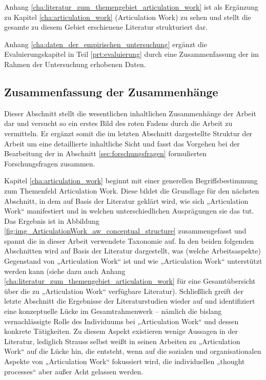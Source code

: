 Anhang \ref{cha:literatur_zum_themengebiet_articulation_work} ist als Ergänzung zu Kapitel \ref{cha:articulation_work} (Articulation Work) zu sehen und stellt die gesamte zu diesem Gebiet erschienene Literatur strukturiert dar.

Anhang \ref{cha:daten_der_empirischen_untersuchung} ergänzt die Evaluierungskapitel in Teil \ref{prt:evaluierung} durch eine Zusammenfassung der im Rahmen der Untersuchung erhobenen Daten.

\subsection{Zusammenfassung der Zusammenhänge} %
\label{sub:zusammenhänge}

Dieser Abschnitt stellt die wesentlichen inhaltlichen Zusammenhänge der Arbeit dar und versucht so ein erstes Bild des roten Fadens durch die Arbeit zu vermitteln. Er ergänzt somit die im letzten Abschnitt dargestellte Struktur der Arbeit um eine detaillierte inhaltliche Sicht und fasst das Vorgehen bei der Bearbeitung der in Abschnitt \ref{sec:forschungsfragen} formulierten Forschungsfragen zusammen.

Kapitel \ref{cha:articulation_work} beginnt mit einer generellen Begriffsbestimmung zum Themenfeld Articulation Work. Diese bildet die Grundlage für den nächsten Abschnitt, in dem auf Basis der Literatur geklärt wird, wie sich „Articulation Work“ manifestiert und in welchen unterschiedlichen Ausprägungen sie das tut. Das Ergebnis ist in Abbildung \ref{fig:img_ArticulationWork_aw_conceptual_structure} zusammengefasst und spannt die in dieser Arbeit verwendete Taxonomie auf. In den beiden folgenden Abschnitten wird auf Basis der Literatur dargestellt, was (welche Arbeitsaspekte) Gegenstand von „Articulation Work“ ist und wie „Articulation Work“ unterstützt werden kann (siehe dazu auch Anhang \ref{cha:literatur_zum_themengebiet_articulation_work} für eine Gesamtübersicht über die zu „Articulation Work“ verfügbare Literatur). Schließlich greift der letzte Abschnitt die Ergebnisse der Literaturstudien wieder auf und identifiziert eine konzeptuelle Lücke im Gesamtrahmenwerk -- nämlich die bislang vernachlässigte Rolle des Individuums bei „Articulation Work“ und dessen konkrete Tätigkeiten. Zu diesem Aspekt existieren wenige Aussagen in der Literatur, lediglich Strauss selbst weißt in seinen Arbeiten zu „Articulation Work“ auf die Lücke hin, die entsteht, wenn auf die sozialen und organisationalen Aspekte von „Articulation Work“ fokussiert wird, die individuellen „thought processes“ aber außer Acht gelassen werden.

